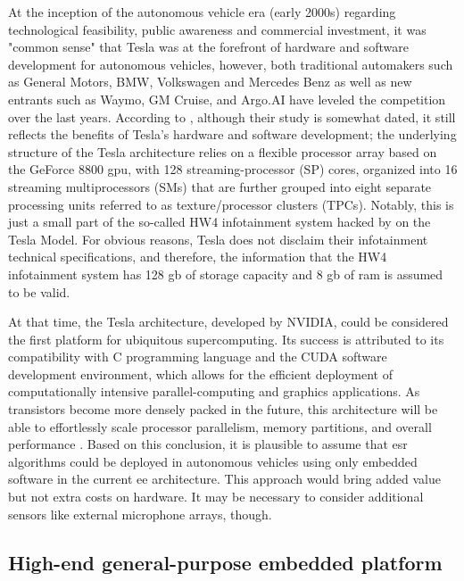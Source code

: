 At the inception of the autonomous vehicle era (early 2000s) regarding technological feasibility, public awareness and commercial investment, it was "common sense" that Tesla was at the forefront of hardware and software development for autonomous vehicles, however, both traditional automakers such as General Motors, BMW, Volkswagen and Mercedes Benz as well as new entrants such as Waymo, GM Cruise, and Argo.AI have leveled the competition over the last years. According to \textcite{Lindholm2008}, although their study is somewhat dated, it still reflects the benefits of Tesla's hardware and software development; the underlying structure of the Tesla architecture relies on a flexible processor array based on the GeForce 8800 \gls{gpu}, with 128 streaming-processor (SP) cores, organized into 16 streaming multiprocessors (SMs) that are further grouped into eight separate processing units referred to as texture/processor clusters (TPCs). Notably, this is just a small part of the so-called HW4 infotainment system hacked by \textcite{Teslanorth2023} on the Tesla Model. For obvious reasons, Tesla does not disclaim their infotainment technical specifications, and therefore, the information that the HW4 infotainment system has 128 \gls{g}\gls{b} of storage capacity and 8 \gls{g}\gls{b} of \gls{ram} is assumed to be valid.

At that time, the Tesla architecture, developed by NVIDIA, could be considered the first platform for ubiquitous supercomputing. Its success is attributed to its compatibility with C programming language and the CUDA software development environment, which allows for the efficient deployment of computationally intensive parallel-computing and graphics applications. As transistors become more densely packed in the future, this architecture will be able to effortlessly scale processor parallelism, memory partitions, and overall performance \cite{Lindholm2008}. Based on this conclusion, it is plausible to assume that \gls{esr} algorithms could be deployed in autonomous vehicles using only embedded software in the current \gls{ee} architecture. This approach would bring added value but not extra costs on hardware. It may be necessary to consider additional sensors like external microphone arrays, though.


\subsection{High-end general-purpose embedded platform}
\label{subsec:ECU_high-end-platform}

